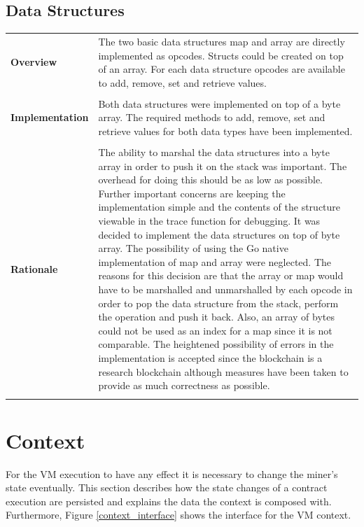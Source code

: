 \subsection{Data Structures}
\begin{tabular}[t]{ p{3cm} p{12.5cm}}
\raggedright
\textbf{Overview} &
The two basic data structures map and array are directly implemented as opcodes. Structs could be created on top of an array. For each data structure opcodes are available to add, remove, set and retrieve values.\\ \\

\raggedright
\textbf{Implementation} &
Both data structures were implemented on top of a byte array. 
The required methods to add, remove, set and retrieve values for both data types have been implemented.
 \\ \\

\raggedright
\textbf{Rationale} &
The ability to marshal the data structures into a byte array in order to push it on the stack was important. The overhead for doing this should be as low as possible. Further important concerns are keeping the implementation simple and the contents of the structure viewable in the trace function for debugging. It was decided to implement the data structures on top of byte array. The possibility of using the Go native implementation of map and array were neglected. The reasons for this decision are that the array or map would have to be marshalled and unmarshalled by each opcode in order to pop the data structure from the stack, perform the operation and push it back. Also, an array of bytes could not be used as an index for a map since it is not comparable. The heightened possibility of errors in the implementation is accepted since the blockchain is a research blockchain although measures have been taken to provide as much correctness as possible.  \\ \\
\end{tabular}
\section{Context}
For the VM execution to have any effect it is necessary to change the miner's state eventually. This section describes how the state changes of a contract execution are persisted and explains the data the context is composed with. Furthermore, Figure \ref{context_interface} shows the interface for the VM context.

